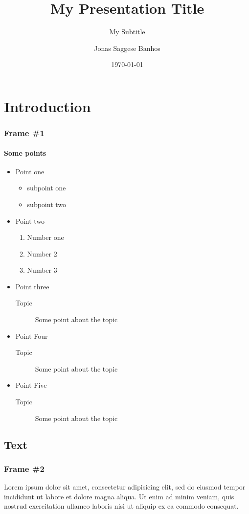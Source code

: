 \documentclass{beamer}
\title{My Presentation Title}
\subtitle{My Subtitle}
\author{Jonas Saggese Banhos}
\date{\today}
\institute{\url{https://cfd.engr.uconn.edu}}
\begin{document}
\begin{frame}
\titlepage
\end{frame}


\section{Introduction}
\begin{frame}
\frametitle{Frame \#1}
\framesubtitle{Some points}
\begin{itemize}
\item Point one
	\begin{itemize}
	\item subpoint one
	\item subpoint two
	\end{itemize}
\item Point two
	\begin{enumerate}
	\item Number one
	\item Number 2
	\item Number 3
	\end{enumerate}
\item Point three
	\begin{description}
	\item[Topic] Some point about the topic 
	\end{description}
\item Point Four
	\begin{description}
	\item[Topic] Some point about the topic 
	\end{description}
\item Point Five
	\begin{description}
	\item[Topic] Some point about the topic 
	\end{description}
\end{itemize}
\end{frame}

\subsection{Text}
\begin{frame}
\frametitle{Frame \#2}
Lorem ipsum dolor sit amet, consectetur adipisicing elit, sed do eiusmod tempor incididunt ut labore et dolore magna aliqua. Ut enim ad minim veniam, quis nostrud exercitation ullamco laboris nisi ut aliquip ex ea commodo consequat.
\end{frame}
\end{document}
